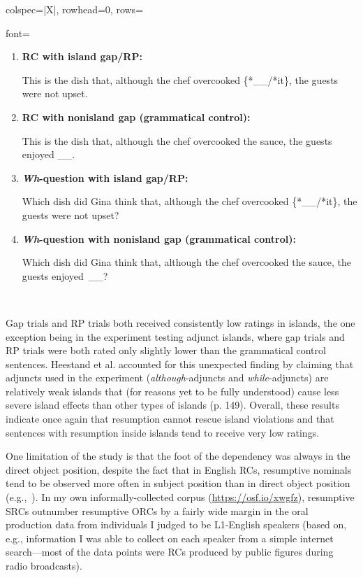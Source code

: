 \begin{longtblr}[caption={\textcite{heestand.etal2011}: Acceptability judgment tasks}, label={tblr:heestand}]{colspec={|X|}, rowhead=0, rows={font=\raggedright{}}}
\begin{varwidth}{\linewidth}
\begin{enumerate}[\bfseries (a),itemsep=5pt]
\item \textbf{RC with island gap/RP:}\par\nobreak
This is the dish that, although the chef overcooked \{*\_\_/*it\}, the guests were not upset.
\item \textbf{RC with nonisland gap (grammatical control):}\par\nobreak
This is the dish that, although the chef overcooked the sauce, the guests enjoyed \_\_.
\item \textbf{\textit{Wh}-question with island gap/RP:}\par\nobreak
Which dish did Gina think that, although the chef overcooked \{*\_\_/*it\}, the guests were not upset? 
\item \textbf{\textit{Wh}-question with nonisland gap (grammatical control):}\par\nobreak
Which dish did Gina think that, although the chef overcooked the sauce, the guests enjoyed~\_\_? 
\end{enumerate}\end{varwidth}\\\hline
\end{longtblr}

Gap trials and RP trials both received consistently low ratings in islands, the one exception being in the experiment testing adjunct islands, where gap trials and RP trials were both rated only slightly lower than the grammatical control sentences. Heestand et al. accounted for this unexpected finding by claiming that adjuncts used in the experiment (\textit{although}-adjuncts and \textit{while}-adjuncts) are relatively weak islands that (for reasons yet to be fully understood) cause less severe island effects than other types of islands (p. 149). Overall, these results indicate once again that resumption cannot rescue island violations and that sentences with resumption inside islands tend to receive very low ratings. 

One limitation of the \textcite{heestand.etal2011} study is that the foot of the dependency was always in the direct object position, despite the fact that in English RCs, resumptive nominals tend to be observed more often in subject position than in direct object position (e.g.,~\cite{morgan.wagers2018}). In my own informally-collected corpus (\url{https://osf.io/xwgfz}), resumptive SRCs outnumber resumptive ORCs by a fairly wide margin in the oral production data from individuals I judged to be L1-English speakers (based on, e.g., information I was able to collect on each speaker from a simple internet search---most of the data points were RCs produced by public figures during radio broadcasts).\footnotemark{} 

